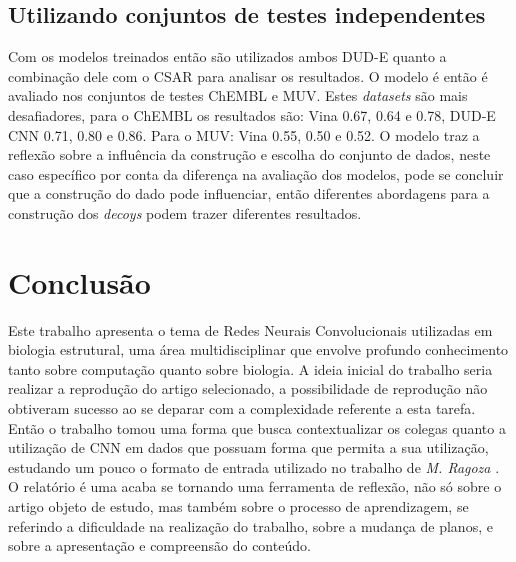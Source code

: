 \documentclass[utf8]{frontiersSCNS} %
\begin{document}
\subsection{Utilizando conjuntos de testes independentes}
Com os modelos treinados então são utilizados ambos DUD-E quanto a combinação dele com o CSAR para analisar os resultados. O modelo é então é avaliado nos conjuntos de testes ChEMBL e MUV. Estes \textit{datasets} são mais desafiadores, para o ChEMBL os resultados são: Vina 0.67,  0.64 e 0.78, DUD-E CNN 0.71, 0.80 e 0.86. Para o MUV: Vina 0.55, 0.50 e 0.52. O modelo traz a reflexão sobre a influência da construção e escolha do conjunto de dados, neste caso específico por conta da diferença na avaliação dos modelos, pode se concluir que a construção do dado pode influenciar, então diferentes abordagens para a construção dos \textit{decoys} podem trazer diferentes resultados.


\section{Conclusão}

Este trabalho apresenta o tema de Redes Neurais Convolucionais utilizadas em biologia estrutural, uma área multidisciplinar que envolve profundo conhecimento tanto sobre computação quanto sobre biologia. A ideia inicial do trabalho seria realizar a reprodução do artigo selecionado, a possibilidade de reprodução não obtiveram sucesso ao se deparar com a complexidade referente a esta tarefa. Então o trabalho tomou uma forma que busca contextualizar os colegas quanto a utilização de CNN em dados que possuam forma que permita a sua utilização, estudando um pouco o formato de entrada utilizado no trabalho de \textit{M. Ragoza }\cite{plscnn}.
O relatório é uma acaba se tornando uma ferramenta de reflexão, não só sobre o artigo objeto de estudo, mas também sobre o processo de aprendizagem, se referindo a dificuldade na realização do trabalho, sobre a mudança de planos, e sobre a apresentação e compreensão do conteúdo.


\end{document}

